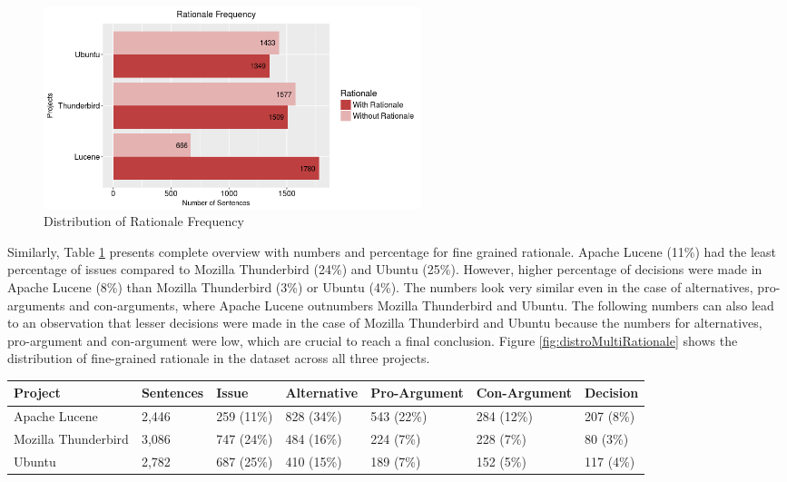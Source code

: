 \documentclass[a4paper,12pt,twoside]{report}
\begin{document}
\begin{figure}[H] %
    \centering
    \includegraphics[width=11cm]{binary-distro-rationale}
    \caption{Distribution of Rationale Frequency}
    \label{fig:distroBinaryRationale}
\end{figure}
\noindent
Similarly, Table \ref{tab:distroMultiRationale} presents complete overview with numbers and percentage for fine grained rationale. Apache Lucene (11\%) had the least percentage of issues compared to Mozilla Thunderbird (24\%) and Ubuntu (25\%). However, higher percentage of decisions were made in Apache Lucene (8\%) than Mozilla Thunderbird (3\%) or Ubuntu (4\%). The numbers look very similar even in the case of alternatives, pro-arguments and con-arguments, where Apache Lucene outnumbers Mozilla Thunderbird and Ubuntu. 
\newline \newline
The following numbers can also lead to an observation that lesser decisions were made in the case of Mozilla Thunderbird and Ubuntu because the numbers for alternatives, pro-argument and con-argument were low, which are crucial to reach a final conclusion. Figure \ref{fig:distroMultiRationale} shows the distribution of fine-grained rationale in the dataset across all three projects. 
\begin{table}[H]  %
    \centering
    \begin{adjustbox}{max width=\columnwidth}
    \def\arraystretch{1} %
    \begin{tabular}{p{4cm} p{2cm} p{2cm} p{3cm} p{2cm} p{2cm} p{2cm}}
        \toprule
        \textbf{Project} & \textbf{Sentences} & \textbf{Issue} & \textbf{Alternative} & \textbf{Pro-Argument}  & \textbf{Con-Argument}  & \textbf{Decision} \\
        \midrule
			Apache Lucene & 2,446 & 259 (11\%) & 828 (34\%)  & 543 (22\%) & 284 (12\%) & 207 (8\%)\\
			Mozilla Thunderbird & 3,086 & 747 (24\%) & 484 (16\%) & 224 (7\%) & 228 (7\%) & 80 (3\%)\\ 
			Ubuntu & 2,782 & 687 (25\%) & 410 (15\%) & 189 (7\%) & 152 (5\%) & 117 (4\%)\\
        \midrule
    \end{tabular}
    \end{adjustbox}
    \label{tab:distroMultiRationale}
\end{table}
\end{document}
